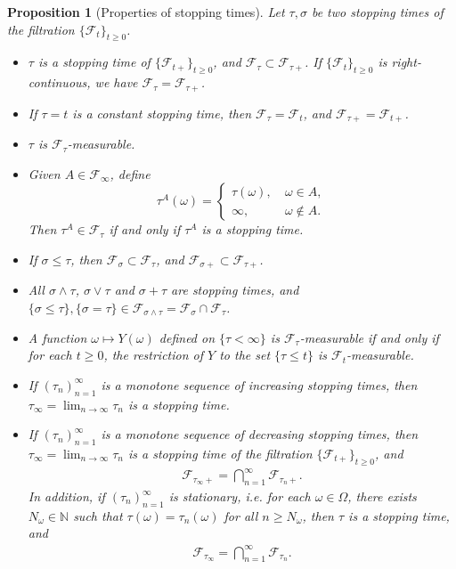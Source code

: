 \documentclass{article}
\numberwithin{equation}{section}
\theoremstyle{plain}
\newtheorem{proposition}[theorem]{Proposition}
\theoremstyle{definition}
\begin{document}
\begin{proposition}[Properties of stopping times]\label{prop:3.11} Let $\tau,\sigma$ be two stopping times of the filtration $\{\mathscr{F}_t\}_{t\geq 0}$.
\begin{itemize}
\item[(i)] $\tau$ is a stopping time of $\{\mathscr{F}_{t+}\}_{t\geq 0}$, and $\mathscr{F}_\tau\subset\mathscr{F}_{\tau+}$. If $\{\mathscr{F}_t\}_{t\geq 0}$ is right-continuous, we have $\mathscr{F}_\tau=\mathscr{F}_{\tau+}$.
\item[(ii)] If $\tau=t$ is a constant stopping time, then $\mathscr{F}_{\tau}=\mathscr{F}_t$, and $\mathscr{F}_{\tau+}=\mathscr{F}_{t+}$.
\item[(iii)] $\tau$ is $\mathscr{F}_\tau$-measurable.
\item[(iv)] Given $A\in\mathscr{F}_\infty$, define $$\tau^A(\omega)=\begin{cases}
	\tau(\omega),\ &\omega\in A,\\
	\infty,\ &\omega\notin A.
\end{cases}$$ 
Then $\tau^A\in\mathscr{F}_\tau$ if and only if $\tau^A$ is a stopping time.
\item[(v)] If $\sigma\leq\tau$, then $\mathscr{F}_\sigma\subset\mathscr{F}_{\tau}$, and $\mathscr{F}_{\sigma+}\subset\mathscr{F}_{\tau+}$.
\item[(vi)] All $\sigma\wedge\tau$, $\sigma\vee\tau$ and $\sigma+\tau$ are stopping times, and  $\{\sigma\leq\tau\},\{\sigma=\tau\}\in\mathscr{F}_{\sigma\wedge\tau}=\mathscr{F}_\sigma\cap\mathscr{F}_\tau$.
\item[(vii)] A function $\omega\mapsto Y(\omega)$ defined on $\{\tau<\infty\}$ is $\mathscr{F}_\tau$-measurable if and only if for each $t\geq 0$, the restriction of $Y$ to the set $\{\tau\leq t\}$ is $\mathscr{F}_t$-measurable.
\item[(viii)] If $(\tau_n)_{n=1}^\infty$ is a monotone sequence of increasing stopping times, then $\tau_\infty=\lim_{n\to\infty}\tau_n$ is a stopping time.
\item[(ix)] If $(\tau_n)_{n=1}^\infty$ is a monotone sequence of decreasing stopping times, then $\tau_\infty=\lim_{n\to\infty}\tau_n$ is a stopping time of the filtration $\{\mathscr{F}_{t+}\}_{t\geq 0}$, and
\begin{align*}
	\mathscr{F}_{\tau_\infty+}=\bigcap_{n=1}^\infty\mathscr{F}_{\tau_n+}.
\end{align*}
In addition, if $(\tau_n)_{n=1}^\infty$ is stationary, i.e. for each $\omega\in\Omega$, there exists $N_\omega\in\mathbb{N}$ such that $\tau(\omega)=\tau_n(\omega)$ for all $n\geq N_\omega$, then $\tau$ is a stopping time, and
\begin{align*}
	\mathscr{F}_{\tau_\infty}=\bigcap_{n=1}^\infty\mathscr{F}_{\tau_n}.
\end{align*}
\end{itemize}
\end{proposition}
\end{document}
